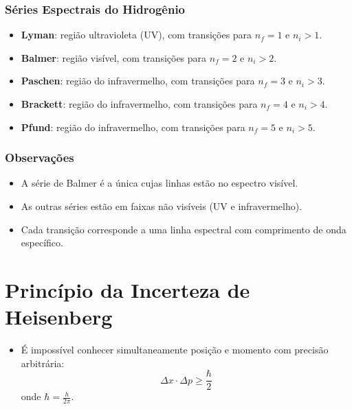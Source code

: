 \documentclass[a4paper,12pt]{article}
\begin{document}
\begin{multicols}{2}
\subsubsection{Séries Espectrais do Hidrogênio}

\begin{itemize}
  \item \textbf{Lyman}: região ultravioleta (UV), com transições para $n_f = 1$ e $n_i > 1$.
  \item \textbf{Balmer}: região visível, com transições para $n_f = 2$ e $n_i > 2$.
  \item \textbf{Paschen}: região do infravermelho, com transições para $n_f = 3$ e $n_i > 3$.
  \item \textbf{Brackett}: região do infravermelho, com transições para $n_f = 4$ e $n_i > 4$.
  \item \textbf{Pfund}: região do infravermelho, com transições para $n_f = 5$ e $n_i > 5$.
\end{itemize}

\subsubsection{Observações}
\begin{itemize}
    \item A série de Balmer é a única cujas linhas estão no espectro visível.
    \item As outras séries estão em faixas não visíveis (UV e infravermelho).
    \item Cada transição corresponde a uma linha espectral com comprimento de onda específico.
\end{itemize}

\section{Princípio da Incerteza de Heisenberg}
\begin{itemize}
    \item É impossível conhecer simultaneamente posição e momento com precisão arbitrária:
    \[
        \Delta x \cdot \Delta p \geq \frac{\hbar}{2}
    \]
    onde $\hbar = \frac{h}{2\pi}$.
\end{itemize}


\end{multicols}
\end{document}
